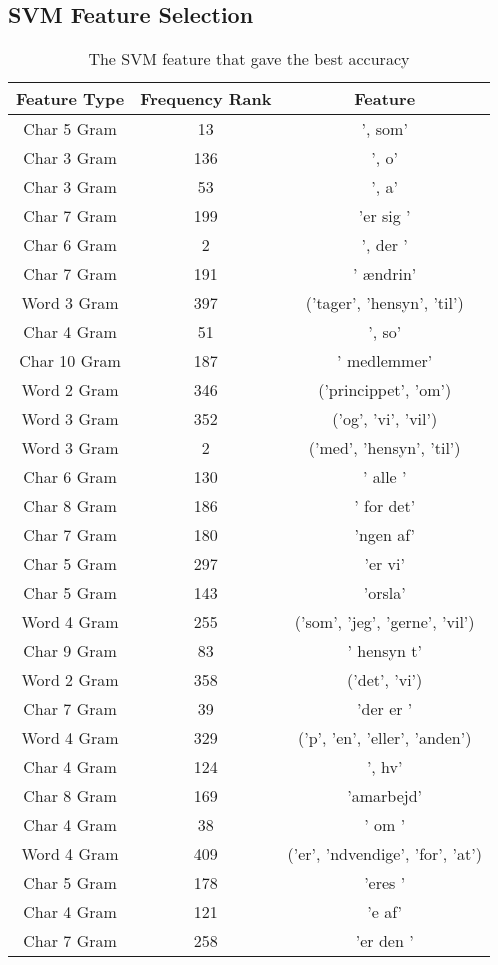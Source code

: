 \subsection{SVM Feature Selection}
\begin{table}
\centering
\caption{The SVM feature that gave the best accuracy}
\begin{tabular}{ccc}
Feature Type & Frequency Rank & Feature \\ \hline
Char 5 Gram & 13 & ', som'\\
Char 3 Gram & 136 & ', o'\\
Char 3 Gram & 53 & ', a'\\
Char 7 Gram & 199 & 'er sig '\\
Char 6 Gram & 2 & ', der '\\
Char 7 Gram & 191 & ' ændrin'\\
Word 3 Gram & 397 & ('tager', 'hensyn', 'til')\\
Char 4 Gram & 51 & ', so'\\
Char 10 Gram & 187 & ' medlemmer'\\
Word 2 Gram & 346 & ('princippet', 'om')\\
Word 3 Gram & 352 & ('og', 'vi', 'vil')\\
Word 3 Gram & 2 & ('med', 'hensyn', 'til')\\
Char 6 Gram & 130 & ' alle '\\
Char 8 Gram & 186 & ' for det'\\
Char 7 Gram & 180 & 'ngen af'\\
Char 5 Gram & 297 & 'er vi'\\
Char 5 Gram & 143 & 'orsla'\\
Word 4 Gram & 255 & ('som', 'jeg', 'gerne', 'vil')\\
Char 9 Gram & 83 & ' hensyn t'\\
Word 2 Gram & 358 & ('det', 'vi')\\
Char 7 Gram & 39 & 'der er '\\
Word 4 Gram & 329 & ('p', 'en', 'eller', 'anden')\\
Char 4 Gram & 124 & ', hv'\\
Char 8 Gram & 169 & 'amarbejd'\\
Char 4 Gram & 38 & ' om '\\
Word 4 Gram & 409 & ('er', 'ndvendige', 'for', 'at')\\
Char 5 Gram & 178 & 'eres '\\
Char 4 Gram & 121 & 'e af'\\
Char 7 Gram & 258 & 'er den '\\

\end{tabular}
\end{table}
